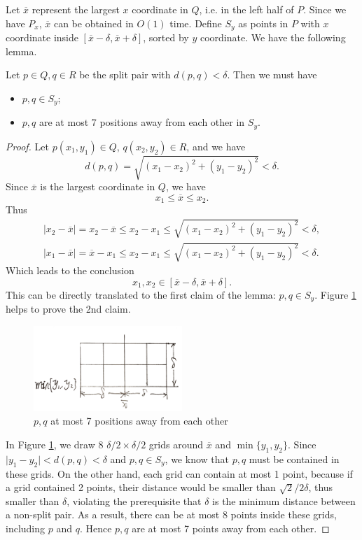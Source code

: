 Let $\overline{x}$ represent the largest $x$ coordinate in $Q$, i.e. in the left half of $P$. Since we have $P_x$, $\overline{x}$ can be obtained in $O(1)$ time. Define $S_y$ as points in $P$ with $x$ coordinate inside $[\overline{x}-\delta,\overline{x}+\delta]$, sorted by $y$ coordinate. We have the following lemma.
\begin{lemma}\label{lemmaforclosesplitpair}
Let $p\in Q,q\in R$ be the split pair with $d(p,q)<\delta$. Then we must have
\begin{itemize}
\item $p,q\in S_y$;
\item $p,q$ are at most 7 positions away from each other in $S_y$. 
\end{itemize}
\end{lemma}
\begin{proof}
Let $p(x_1,y_1)\in Q$, $q(x_2,y_2)\in R$, and we have 
$$d(p,q)=\sqrt{(x_1-x_2)^2+(y_1-y_2)^2}<\delta.$$
Since $\overline{x}$ is the largest coordinate in $Q$, we have 
$$x_1\leq \overline{x}\leq x_2.$$
Thus 
\begin{align*}
\lvert x_2-\overline{x}\rvert=x_2-\overline{x}\leq x_2-x_1\leq\sqrt{(x_1-x_2)^2+(y_1-y_2)^2}<\delta,\\
\lvert x_1-\overline{x}\rvert=\overline{x}-x_1\leq x_2-x_1\leq\sqrt{(x_1-x_2)^2+(y_1-y_2)^2}<\delta.
\end{align*}
Which leads to the conclusion
$$x_1,x_2\in[\overline{x}-\delta,\overline{x}+\delta].$$
This can be directly translated to the first claim of the lemma: $p,q\in S_y$. Figure \ref{pq7position} helps to prove the 2nd claim.  
\begin{figure}[H]
\centering
\includegraphics[width=0.5\textwidth]{closestpointlemma.jpg}
\caption{$p,q$ at most 7 positions away from each other}\label{pq7position}
\end{figure}

In Figure \ref{pq7position}, we draw 8 $\delta/2\times\delta/2$ grids around $\overline{x}$ and $\min\{y_1,y_2\}$. Since $\lvert y_1-y_2\rvert<d(p,q)<\delta$ and $p,q\in S_y$, we know that $p,q$ must be contained in these grids. On the other hand, each grid can contain at most 1 point, because if a grid contained 2 points, their distance would be smaller than $\sqrt{2}/2\delta$, thus smaller than $\delta$, violating the prerequisite that $\delta$ is the minimum distance between a non-split pair. As a result, there can be at most 8 points inside these grids, including $p$ and $q$. Hence $p,q$ are at most 7 points away from each other.
\end{proof}
